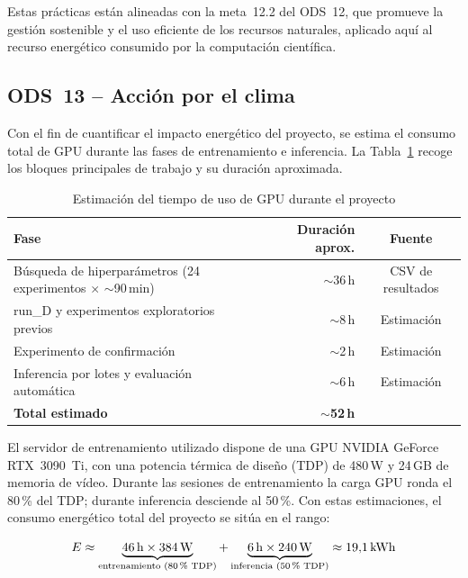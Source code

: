 \documentclass[%
    school=etsisi,%
    type=pfg,%
    degree=61CD,%
]{upm-report}
\begin{document}
Estas pr\'acticas est\'an alineadas con la meta~12.2 del ODS~12, que promueve la gesti\'on sostenible y el uso eficiente de los recursos naturales, aplicado aqu\'i al recurso energ\'etico consumido por la computaci\'on cient\'ifica.

\subsection{ODS~13 -- Acci\'on por el clima}

Con el fin de cuantificar el impacto energ\'etico del proyecto, se estima el consumo total de GPU durante las fases de entrenamiento e inferencia. La Tabla~\ref{tab:consumo-gpu} recoge los bloques principales de trabajo y su duraci\'on aproximada.

\begin{table}[H]
    \centering
    \caption{Estimaci\'on del tiempo de uso de GPU durante el proyecto}
    \label{tab:consumo-gpu}
    \small
    \begin{tabular}{lrc}
        \toprule
        \textbf{Fase} & \textbf{Duraci\'on aprox.} & \textbf{Fuente} \\
        \midrule
        B\'usqueda de hiperpar\'ametros (24 experimentos $\times$ ${\sim}$90\,min) & ${\sim}$36\,h & CSV de resultados \\
        run\_D y experimentos exploratorios previos                    & ${\sim}$8\,h  & Estimaci\'on \\
        Experimento de confirmaci\'on                                  & ${\sim}$2\,h  & Estimaci\'on \\
        Inferencia por lotes y evaluaci\'on autom\'atica               & ${\sim}$6\,h  & Estimaci\'on \\
        \midrule
        \textbf{Total estimado}                                        & ${\sim}$\textbf{52\,h} & \\
        \bottomrule
    \end{tabular}
\end{table}

El servidor de entrenamiento utilizado dispone de una GPU NVIDIA GeForce RTX~3090~Ti, con una potencia t\'ermica de dise\~no (TDP) de 480\,W y 24\,GB de memoria de v\'ideo. Durante las sesiones de entrenamiento la carga GPU ronda el 80\,\% del TDP; durante inferencia desciende al 50\,\%. Con estas estimaciones, el consumo energ\'etico total del proyecto se sit\'ua en el rango:

\begin{equation}
    E \approx
    \underbrace{46\,\text{h} \times 384\,\text{W}}_{\text{entrenamiento (80\,\% TDP)}}
    +
    \underbrace{6\,\text{h} \times 240\,\text{W}}_{\text{inferencia (50\,\% TDP)}}
    \approx 19{,}1\,\text{kWh}
    \label{eq:consumo}
\end{equation}
\end{document}
